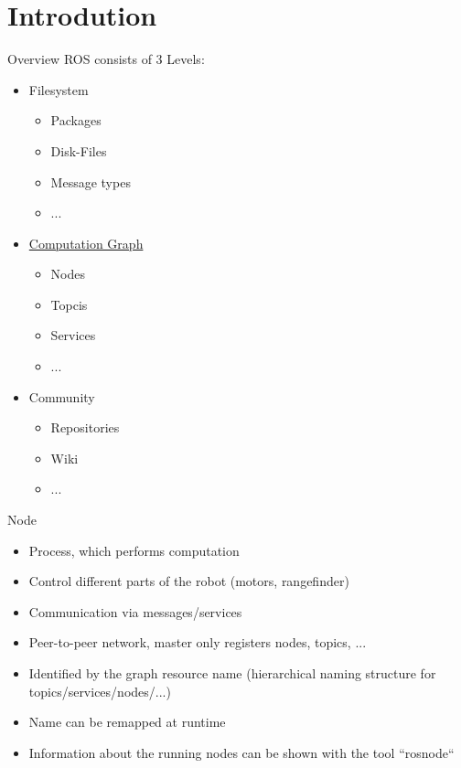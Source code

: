\documentclass{beamer}
\begin{document}
\section{Introdution}
\begin{frame}{Overview}
	ROS consists of 3 Levels:
	\begin{itemize}
		\item Filesystem
			\begin{itemize}
				\item Packages
				\item Disk-Files
				\item Message types
				\item ...
			\end{itemize}
		\item \underline{Computation Graph}
			\begin{itemize}
				\item Nodes
				\item Topcis
				\item Services
				\item ...
			\end{itemize}
		\item Community
			\begin{itemize}
				\item Repositories
				\item Wiki
				\item ...
			\end{itemize}
	\end{itemize}
\end{frame}
\begin{frame}{Node}
	\begin{itemize}
		\item Process, which performs computation
		\item Control different parts of the robot (motors, rangefinder)
		\item Communication via messages/services
		\item Peer-to-peer network, master only registers nodes, topics, ...
		\item Identified by the graph resource name (hierarchical naming structure for topics/services/nodes/...)
		\item Name can be remapped at runtime
		\item Information about the running nodes can be shown with the tool ``rosnode``
	\end{itemize}
\end{frame}
\end{document}
